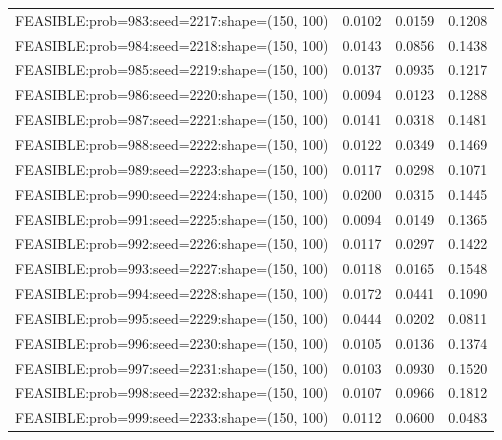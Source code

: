 \begin{longtable}{lccc}
FEASIBLE:prob=983:seed=2217:shape=(150, 100) & 0.0102 & 0.0159 & 0.1208 \\
FEASIBLE:prob=984:seed=2218:shape=(150, 100) & 0.0143 & 0.0856 & 0.1438 \\
FEASIBLE:prob=985:seed=2219:shape=(150, 100) & 0.0137 & 0.0935 & 0.1217 \\
FEASIBLE:prob=986:seed=2220:shape=(150, 100) & 0.0094 & 0.0123 & 0.1288 \\
FEASIBLE:prob=987:seed=2221:shape=(150, 100) & 0.0141 & 0.0318 & 0.1481 \\
FEASIBLE:prob=988:seed=2222:shape=(150, 100) & 0.0122 & 0.0349 & 0.1469 \\
FEASIBLE:prob=989:seed=2223:shape=(150, 100) & 0.0117 & 0.0298 & 0.1071 \\
FEASIBLE:prob=990:seed=2224:shape=(150, 100) & 0.0200 & 0.0315 & 0.1445 \\
FEASIBLE:prob=991:seed=2225:shape=(150, 100) & 0.0094 & 0.0149 & 0.1365 \\
FEASIBLE:prob=992:seed=2226:shape=(150, 100) & 0.0117 & 0.0297 & 0.1422 \\
FEASIBLE:prob=993:seed=2227:shape=(150, 100) & 0.0118 & 0.0165 & 0.1548 \\
FEASIBLE:prob=994:seed=2228:shape=(150, 100) & 0.0172 & 0.0441 & 0.1090 \\
FEASIBLE:prob=995:seed=2229:shape=(150, 100) & 0.0444 & 0.0202 & 0.0811 \\
FEASIBLE:prob=996:seed=2230:shape=(150, 100) & 0.0105 & 0.0136 & 0.1374 \\
FEASIBLE:prob=997:seed=2231:shape=(150, 100) & 0.0103 & 0.0930 & 0.1520 \\
FEASIBLE:prob=998:seed=2232:shape=(150, 100) & 0.0107 & 0.0966 & 0.1812 \\
FEASIBLE:prob=999:seed=2233:shape=(150, 100) & 0.0112 & 0.0600 & 0.0483 \\
\end{longtable}
